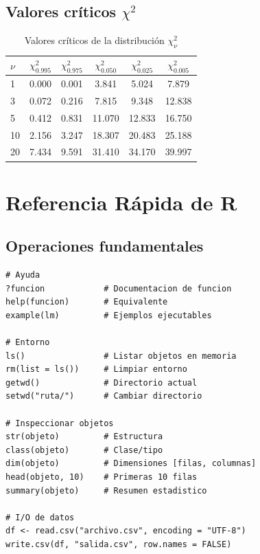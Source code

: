 \documentclass[
  10pt,           %
  twoside,        %
  openright       %
]{book}
\begin{document}
\section{Valores críticos $\chi^2$}

\begin{table}[H]
\centering
\caption{Valores críticos de la distribución $\chi^2_\nu$}
\begin{tabular}{@{}lccccc@{}}
\toprule
$\nu$ & $\chi^2_{0.995}$ & $\chi^2_{0.975}$ & $\chi^2_{0.050}$ & $\chi^2_{0.025}$ & $\chi^2_{0.005}$ \\
\midrule
1  & 0.000 & 0.001 & 3.841 &  5.024 &  7.879 \\
3  & 0.072 & 0.216 & 7.815 &  9.348 & 12.838 \\
5  & 0.412 & 0.831 & 11.070 & 12.833 & 16.750 \\
10 & 2.156 & 3.247 & 18.307 & 20.483 & 25.188 \\
20 & 7.434 & 9.591 & 31.410 & 34.170 & 39.997 \\
\bottomrule
\end{tabular}
\end{table}

\chapter{Referencia Rápida de R}

\section{Operaciones fundamentales}

\begin{lstlisting}[caption={Comandos R de uso frecuente}]
# Ayuda
?funcion            # Documentacion de funcion
help(funcion)       # Equivalente
example(lm)         # Ejemplos ejecutables

# Entorno
ls()                # Listar objetos en memoria
rm(list = ls())     # Limpiar entorno
getwd()             # Directorio actual
setwd("ruta/")      # Cambiar directorio

# Inspeccionar objetos
str(objeto)         # Estructura
class(objeto)       # Clase/tipo
dim(objeto)         # Dimensiones [filas, columnas]
head(objeto, 10)    # Primeras 10 filas
summary(objeto)     # Resumen estadistico

# I/O de datos
df <- read.csv("archivo.csv", encoding = "UTF-8")
write.csv(df, "salida.csv", row.names = FALSE)
\end{lstlisting}
\end{document}
